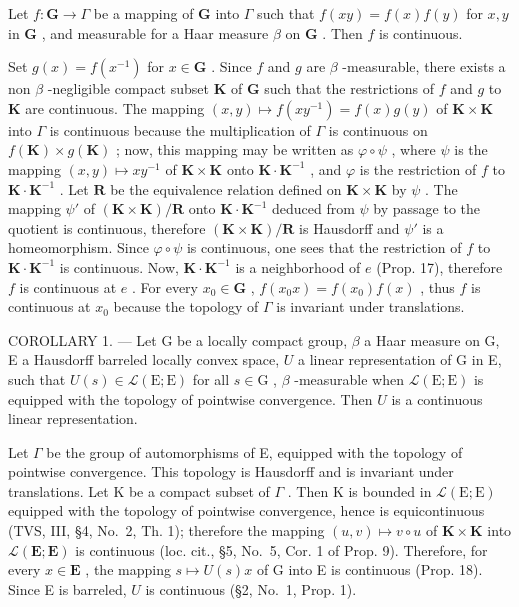 Let \(f: \mathbf{G} \to \Gamma\) be a mapping of \(\mathbf{G}\) into \(\Gamma\) such that \(f(xy) = f(x)f(y)\) for \(x, y\) in \(\mathbf{G}\) , and measurable for a Haar measure \(\beta\) on \(\mathbf{G}\) . Then \(f\) is continuous.

Set \(g(x) = f(x^{-1})\) for \(x \in \mathbf{G}\) . Since \(f\) and \(g\) are \(\beta\) -measurable, there exists a non \(\beta\) -negligible compact subset \(\mathbf{K}\) of \(\mathbf{G}\) such that the restrictions of \(f\) and \(g\) to \(\mathbf{K}\) are continuous. The mapping \((x,y) \mapsto f(xy^{-1}) = f(x)g(y)\) of \(\mathbf{K} \times \mathbf{K}\) into \(\Gamma\) is continuous because the multiplication of \(\Gamma\) is continuous on \(f(\mathbf{K}) \times g(\mathbf{K})\) ; now, this mapping may be written as \(\varphi \circ \psi\) , where \(\psi\) is the mapping \((x,y) \mapsto xy^{-1}\) of \(\mathbf{K} \times \mathbf{K}\) onto \(\mathbf{K} \cdot \mathbf{K}^{-1}\) , and \(\varphi\) is the restriction of \(f\) to \(\mathbf{K} \cdot \mathbf{K}^{-1}\) . Let \(\mathbf{R}\) be the equivalence relation defined on \(\mathbf{K} \times \mathbf{K}\) by \(\psi\) . The mapping \(\psi'\) of \((\mathbf{K} \times \mathbf{K}) / \mathbf{R}\) onto \(\mathbf{K} \cdot \mathbf{K}^{-1}\) deduced from \(\psi\) by passage to the quotient is continuous, therefore \((\mathbf{K} \times \mathbf{K}) / \mathbf{R}\) is Hausdorff and \(\psi'\) is a homeomorphism. Since \(\varphi \circ \psi\) is continuous, one sees that the restriction of \(f\) to \(\mathbf{K} \cdot \mathbf{K}^{-1}\) is continuous. Now, \(\mathbf{K} \cdot \mathbf{K}^{-1}\) is a neighborhood of \(e\) (Prop. 17), therefore \(f\) is continuous at \(e\) . For every \(x_0 \in \mathbf{G}\) , \(f(x_0x) = f(x_0)f(x)\) , thus \(f\) is continuous at \(x_0\) because the topology of \(\Gamma\) is invariant under translations.

COROLLARY 1. --- Let G be a locally compact group, \(\beta\) a Haar measure on G, E a Hausdorff barreled locally convex space, \(U\) a linear representation of G in E, such that \(U(s) \in \mathcal{L}(\mathrm{E};\mathrm{E})\) for all \(s \in \mathrm{G}\) , \(\beta\) -measurable when \(\mathcal{L}(\mathrm{E};\mathrm{E})\) is equipped with the topology of pointwise convergence. Then \(U\) is a continuous linear representation.

Let \(\Gamma\) be the group of automorphisms of E, equipped with the topology of pointwise convergence. This topology is Hausdorff and is invariant under translations. Let K be a compact subset of \(\Gamma\) . Then K is bounded in \(\mathcal{L}(\mathrm{E};\mathrm{E})\) equipped with the topology of pointwise convergence, hence is equicontinuous (TVS, III, §4, No.~2, Th. 1); therefore the mapping \((u,v)\mapsto v\circ u\) of \(\mathbf{K}\times \mathbf{K}\) into \(\mathcal{L}(\mathbf{E};\mathbf{E})\) is continuous (loc. cit., §5, No.~5, Cor. 1 of Prop. 9). Therefore, for every \(x\in \mathbf{E}\) , the mapping \(s\mapsto U(s)x\) of G into E is continuous (Prop. 18). Since E is barreled, \(U\) is continuous (§2, No.~1, Prop. 1).

